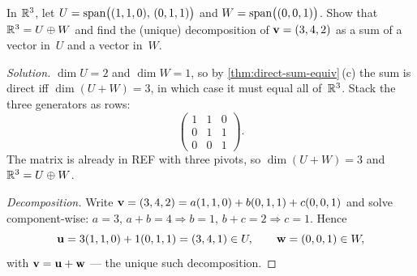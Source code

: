 \begin{problem}
\label{prob:direct-sum-decomp}
In $\mathbb{R}^3$, let $U = \operatorname{span}\bigl((1, 1, 0),\, (0, 1, 1)\bigr)$ and
$W = \operatorname{span}\bigl((0, 0, 1)\bigr)$. Show that $\mathbb{R}^3 = U \oplus W$ and
find the (unique) decomposition of $\mathbf{v} = (3, 4, 2)$ as a sum of
a vector in~$U$ and a vector in~$W$.
\end{problem}

\begin{proof}[Solution]
$\dim U = 2$ and $\dim W = 1$, so by \cref{thm:direct-sum-equiv}\,(c)
the sum is direct iff $\dim(U + W) = 3$, in which case it must equal
all of~$\mathbb{R}^3$. Stack the three generators as rows:
\[
  \begin{pmatrix}
    1 & 1 & 0 \\
    0 & 1 & 1 \\
    0 & 0 & 1
  \end{pmatrix}.
\]
The matrix is already in REF with three pivots, so $\dim(U + W) = 3$
and $\mathbb{R}^3 = U \oplus W$.

\emph{Decomposition.} Write
$\mathbf{v} = (3, 4, 2) = a(1,1,0) + b(0,1,1) + c(0,0,1)$ and solve
component-wise: $a = 3$, $a + b = 4 \Rightarrow b = 1$,
$b + c = 2 \Rightarrow c = 1$. Hence
\[
  \mathbf{u} = 3(1, 1, 0) + 1(0, 1, 1) = (3, 4, 1) \in U,
  \qquad
  \mathbf{w} = (0, 0, 1) \in W,
\]
with $\mathbf{v} = \mathbf{u} + \mathbf{w}$ — the unique such
decomposition.
\end{proof}
